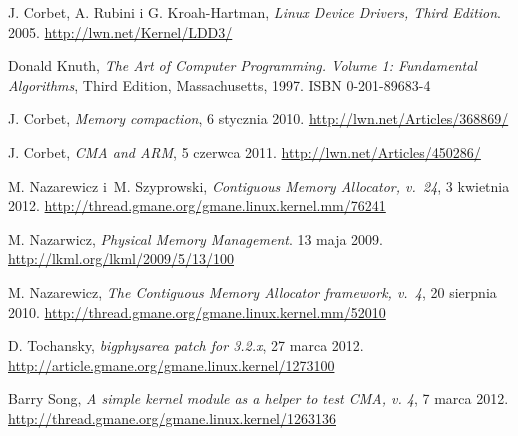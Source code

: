 \begin{thebibliography}{9}

  J. Corbet, A. Rubini i G. Kroah-Hartman,
  \emph{Linux Device Drivers, Third Edition}.
  2005.
  \url{http://lwn.net/Kernel/LDD3/}

  Donald Knuth,
  \emph{The Art of Computer Programming. Volume 1: Fundamental
    Algorithms},
  Third Edition,
  Massachusetts, 1997.
  ISBN 0-201-89683-4

  J. Corbet,
  \emph{Memory compaction},
  6 stycznia 2010.
  \url{http://lwn.net/Articles/368869/}

  J. Corbet,
  \emph{CMA and ARM},
  5 czerwca 2011.
  \url{http://lwn.net/Articles/450286/}

  M. Nazarewicz i~M. Szyprowski,
  \emph{Contiguous Memory Allocator, v.\ 24},
  3 kwietnia 2012.
  \url{http://thread.gmane.org/gmane.linux.kernel.mm/76241}

  M. Nazarwicz,
  \emph{Physical Memory Management}.
  13 maja 2009.
  \url{http://lkml.org/lkml/2009/5/13/100}

  M. Nazarewicz,
  \emph{The Contiguous Memory Allocator framework, v.\ 4},
  20 sierpnia 2010.
  \url{http://thread.gmane.org/gmane.linux.kernel.mm/52010}

  D. Tochansky,
  \emph{bigphysarea patch for 3.2.x},
  27 marca 2012.
  \url{http://article.gmane.org/gmane.linux.kernel/1273100}

  Barry Song,
  \emph{A simple kernel module as a helper to test CMA, v. 4},
  7 marca 2012.
  \url{http://thread.gmane.org/gmane.linux.kernel/1263136}


\end{thebibliography}
